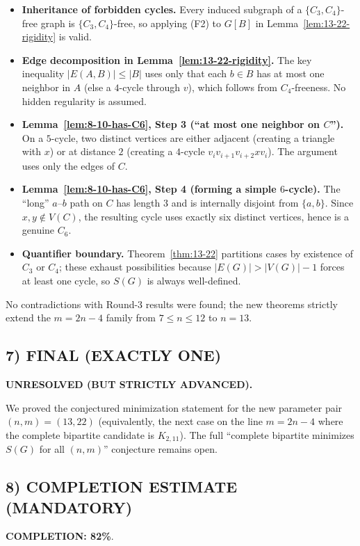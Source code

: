 \begin{itemize}
\item \textbf{Inheritance of forbidden cycles.} Every induced subgraph of a $\{C_3,C_4\}$-free graph is $\{C_3,C_4\}$-free, so applying (F2) to $G[B]$ in Lemma~\ref{lem:13-22-rigidity} is valid.
\item \textbf{Edge decomposition in Lemma~\ref{lem:13-22-rigidity}.} The key inequality $|E(A,B)|\le |B|$ uses only that each $b\in B$ has at most one neighbor in $A$ (else a $4$-cycle through $v$), which follows from $C_4$-freeness. No hidden regularity is assumed.
\item \textbf{Lemma~\ref{lem:8-10-has-C6}, Step 3 (``at most one neighbor on $C$'').}
On a $5$-cycle, two distinct vertices are either adjacent (creating a triangle with $x$) or at distance $2$ (creating a $4$-cycle $v_i v_{i+1} v_{i+2} x v_i$). The argument uses only the edges of $C$.
\item \textbf{Lemma~\ref{lem:8-10-has-C6}, Step 4 (forming a simple $6$-cycle).}
The ``long'' $a$--$b$ path on $C$ has length $3$ and is internally disjoint from $\{a,b\}$. Since $x,y\notin V(C)$, the resulting cycle uses exactly six distinct vertices, hence is a genuine $C_6$.
\item \textbf{Quantifier boundary.} Theorem~\ref{thm:13-22} partitions cases by existence of $C_3$ or $C_4$; these exhaust possibilities because $|E(G)|>|V(G)|-1$ forces at least one cycle, so $S(G)$ is always well-defined.
\end{itemize}

No contradictions with Round-3 results were found; the new theorems strictly extend the $m=2n-4$ family from $7\le n\le 12$ to $n=13$.

\subsection*{7) FINAL (EXACTLY ONE)}
\textbf{UNRESOLVED (BUT STRICTLY ADVANCED).}

We proved the conjectured minimization statement for the new parameter pair $(n,m)=(13,22)$ (equivalently, the next case on the line $m=2n-4$ where the complete bipartite candidate is $K_{2,11}$).
The full ``complete bipartite minimizes $S(G)$ for all $(n,m)$'' conjecture remains open.

\subsection*{8) COMPLETION ESTIMATE (MANDATORY)}
\textbf{COMPLETION: 82\%}.

